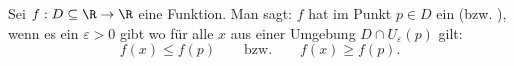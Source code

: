 Sei $f: D \subseteq \R \to \R$ eine Funktion. Man sagt: $f$ hat im Punkt $p \in D$ ein  (bzw. ), wenn es ein $\varepsilon > 0$ gibt wo für alle $x$ aus einer Umgebung $D \cap U_\varepsilon(p)$ gilt:
$$f(x) \leq f(p) \qquad \text{bzw.} \qquad f(x) \geq f(p).$$